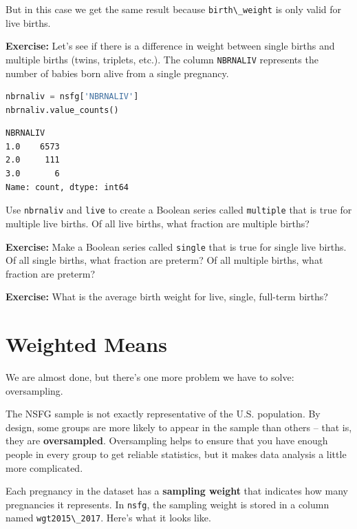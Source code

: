 But in this case we get the same result because
\passthrough{\lstinline!birth\_weight!} is only valid for live births.

\textbf{Exercise:} Let's see if there is a difference in weight between
single births and multiple births (twins, triplets, etc.). The column
\passthrough{\lstinline!NBRNALIV!} represents the number of babies born
alive from a single pregnancy.

\begin{lstlisting}[language=Python,style=source]
nbrnaliv = nsfg['NBRNALIV']
nbrnaliv.value_counts()
\end{lstlisting}

\begin{lstlisting}[style=output]
NBRNALIV
1.0    6573
2.0     111
3.0       6
Name: count, dtype: int64
\end{lstlisting}

Use \passthrough{\lstinline!nbrnaliv!} and
\passthrough{\lstinline!live!} to create a Boolean series called
\passthrough{\lstinline!multiple!} that is true for multiple live
births. Of all live births, what fraction are multiple births?

\textbf{Exercise:} Make a Boolean series called
\passthrough{\lstinline!single!} that is true for single live births. Of
all single births, what fraction are preterm? Of all multiple births,
what fraction are preterm?

\textbf{Exercise:} What is the average birth weight for live, single,
full-term births?

\hypertarget{weighted-means}{%
\section{Weighted Means}\label{weighted-means}}

We are almost done, but there's one more problem we have to solve:
oversampling.

The NSFG sample is not exactly representative of the U.S. population. By
design, some groups are more likely to appear in the sample than others
-- that is, they are \textbf{oversampled}. Oversampling helps to ensure
that you have enough people in every group to get reliable statistics,
but it makes data analysis a little more complicated.

Each pregnancy in the dataset has a \textbf{sampling weight} that
indicates how many pregnancies it represents. In
\passthrough{\lstinline!nsfg!}, the sampling weight is stored in a
column named \passthrough{\lstinline!wgt2015\_2017!}. Here's what it
looks like.

